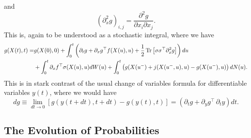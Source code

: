  and 
 $$
 (\partial^2_x g)_{i,j} = \frac{\partial^2 g}{\partial x_i \partial x_j}.
 $$
This is, again to be understood as a stochastic integral, where we have
\begin{align*}
g(X(t),t) =& g(X(0),0) + \int_0^t \left(\partial_t g + \partial_x g^\top f(X(u),u) +\frac{1}{2}\operatorname{Tr}\left[ \sigma\sigma^\top \partial^2_x g\right]\right) du \\
&+ \int_0^t \partial_x f^\top \sigma(X(u),u) dW(u) +\int_0^t \left(g(X(u^-)+j(X(u^-,u),u)-g(X(u^-),u)\right)dN(u).
\end{align*}
This is in stark contrast of the usual change of variables formula for differentiable variables $y(t)$, where we would have
\[
dg\equiv \lim_{dt \to 0} \left[g(y(t+dt),t+dt) - g(y(t),t)\right]= \left(\partial_t g + \partial_y g^\top \, \partial_t y \right)dt.
\]

\subsection{The Evolution of Probabilities}

